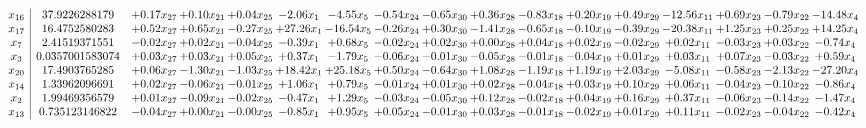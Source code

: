 \documentclass[9pt]{article}
\begin{document}
 \[\begin{array}{c| c c@{\hskip 2pt} c@{\hskip 2pt} c@{\hskip 2pt} c@{\hskip 2pt} c@{\hskip 2pt} c@{\hskip 2pt} c@{\hskip 2pt} c@{\hskip 2pt} c@{\hskip 2pt} c@{\hskip 2pt} c@{\hskip 2pt} c@{\hskip 2pt} c@{\hskip 2pt} c@{\hskip 2pt} c@{\hskip 2pt} }
 x_{16}   &  37.9226288179 & +  0.17 x_{27} & +  0.10 x_{21} & +  0.04 x_{25} & -2.06 x_{1} & -4.55 x_{5} & -0.54 x_{24} & -0.65 x_{30} & +  0.36 x_{28} & -0.83 x_{18} & +  0.20 x_{19} & +  0.49 x_{29} & -12.56 x_{11} & +  0.69 x_{23} & -0.79 x_{22} & -14.48 x_{4}\\
 x_{17}   &  16.4752580283 & +  0.52 x_{27} & +  0.65 x_{21} & -0.27 x_{25} & + 27.26 x_{1} & -16.54 x_{5} & -0.26 x_{24} & +  0.30 x_{30} & -1.41 x_{28} & -0.65 x_{18} & -0.10 x_{19} & -0.39 x_{29} & -20.38 x_{11} & +  1.25 x_{23} & +  0.25 x_{22} & + 14.25 x_{4}\\
 x_{7}   &  2.41519371551 & -0.02 x_{27} & +  0.02 x_{21} & -0.04 x_{25} & -0.39 x_{1} & +  0.68 x_{5} & -0.02 x_{24} & +  0.02 x_{30} & +  0.00 x_{28} & +  0.04 x_{18} & +  0.02 x_{19} & -0.02 x_{29} & +  0.02 x_{11} & -0.03 x_{23} & +  0.03 x_{22} & -0.74 x_{4}\\
 x_{3}   &  0.0357001583074 & +  0.03 x_{27} & +  0.03 x_{21} & +  0.05 x_{25} & +  0.37 x_{1} & -1.79 x_{5} & -0.06 x_{24} & -0.01 x_{30} & -0.05 x_{28} & -0.01 x_{18} & -0.04 x_{19} & +  0.01 x_{29} & +  0.03 x_{11} & +  0.07 x_{23} & -0.03 x_{22} & +  0.59 x_{4}\\
 x_{20}   &  17.4903765285 & +  0.06 x_{27} & -1.30 x_{21} & -1.03 x_{25} & + 18.42 x_{1} & + 25.18 x_{5} & +  0.50 x_{24} & -0.64 x_{30} & +  1.08 x_{28} & -1.19 x_{18} & +  1.19 x_{19} & +  2.03 x_{29} & -5.08 x_{11} & -0.58 x_{23} & -2.13 x_{22} & -27.20 x_{4}\\
 x_{14}   &  1.33962096691 & +  0.02 x_{27} & -0.06 x_{21} & -0.01 x_{25} & +  1.06 x_{1} & +  0.79 x_{5} & -0.01 x_{24} & +  0.01 x_{30} & +  0.02 x_{28} & -0.04 x_{18} & +  0.03 x_{19} & +  0.10 x_{29} & +  0.06 x_{11} & -0.04 x_{23} & -0.10 x_{22} & -0.86 x_{4}\\
 x_{2}   &  1.99469356579 & +  0.01 x_{27} & -0.09 x_{21} & -0.02 x_{25} & -0.47 x_{1} & +  1.29 x_{5} & -0.03 x_{24} & -0.05 x_{30} & +  0.12 x_{28} & -0.02 x_{18} & +  0.04 x_{19} & +  0.16 x_{29} & +  0.37 x_{11} & -0.06 x_{23} & -0.14 x_{22} & -1.47 x_{4}\\
 x_{13}   &  0.735123146822 & -0.04 x_{27} & +  0.00 x_{21} & -0.00 x_{25} & -0.85 x_{1} & +  0.95 x_{5} & +  0.05 x_{24} & -0.01 x_{30} & +  0.03 x_{28} & -0.01 x_{18} & -0.02 x_{19} & +  0.01 x_{29} & +  0.11 x_{11} & -0.02 x_{23} & -0.04 x_{22} & -0.42 x_{4}\\

\end{array}\]
\end{document}
